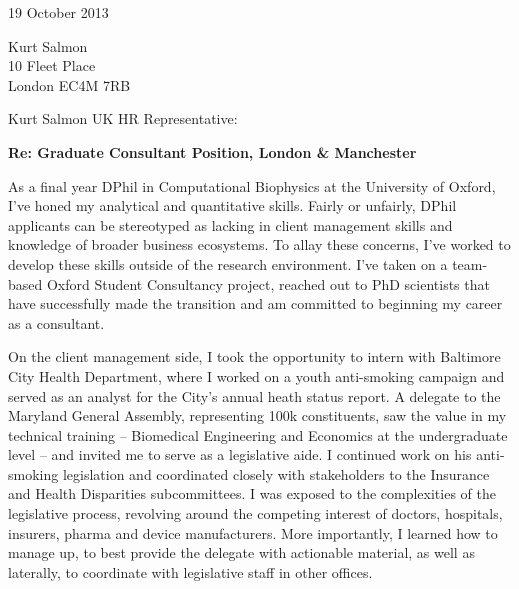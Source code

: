 \documentclass{../res}
\begin{document}
 
\begin{sloppypar}
 


\begin{resume} 
 
\vspace{2\baselineskip}

19 October 2013
\vspace{1\baselineskip}

Kurt Salmon \\
10 Fleet Place \\
London EC4M 7RB
\vspace{1\baselineskip}

Kurt Salmon UK HR Representative:

\textbf{Re: Graduate Consultant Position, London \& Manchester}

As a final year DPhil in Computational Biophysics at the University of Oxford, I've honed my analytical and quantitative skills. Fairly or unfairly, DPhil applicants can be stereotyped as lacking in client management skills and knowledge of broader business ecosystems. To allay these concerns, I've worked to develop these skills outside of the research environment. I've taken on a team-based Oxford Student Consultancy project, reached out to PhD scientists that have successfully made the transition and am committed to beginning my career as a consultant. 




On the client management side, I took the opportunity to intern with Baltimore City Health Department, where I worked on a youth anti-smoking campaign and served as an analyst for the City's annual heath status report. A delegate to the Maryland General Assembly, representing 100k constituents, saw the value in my technical training -- Biomedical Engineering and Economics at the undergraduate level -- and invited me to serve as a legislative aide. I continued work on his anti-smoking legislation and coordinated closely with stakeholders to the Insurance and Health Disparities subcommittees. I was exposed to the complexities of the legislative process, revolving around the competing interest of doctors, hospitals, insurers, pharma and device manufacturers. More importantly, I learned how to manage up, to best provide the delegate with actionable material, as well as laterally, to coordinate with legislative staff in other offices.


\end{resume}
\end{sloppypar}
\end{document}

